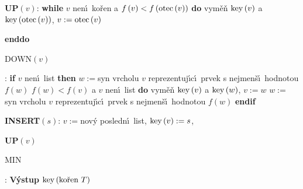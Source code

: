 {\bf UP$\left(v\right)$}:\newline 
{\bf while} $v$ nen\'\i\ ko\v ren a $f\left(v\right)<f\left(\operatorname{otec}\left(v\right)\right)$ {\bf do}\newline 
\phantom{---}vym\v e\v n $\operatorname{key}\left(v\right)$ a $\operatorname{key}\left(\operatorname{otec}\left(v\right)\right)$, $v:=\operatorname{otec}\left(v\right)$\newline 
{\bf enddo
\medskip

DOWN$\left(v\right)$}:\newline 
{\bf if} $v$ nen\'\i\ list {\bf then\newline}
\phantom{---}$w:=$syn vrcholu $v$ reprezentuj\'\i c\'\i\ prvek s nejmen\v s\'\i\ 
hodnotou $f\left(w\right)$\newline 
\phantom{---}{\bf while} $f\left(w\right)<f\left(v\right)$ a $v$ nen\'\i\ list {\bf do\newline }
\phantom{------}vym\v e\v n $\operatorname{key}\left(v\right)$ a $\operatorname{key}\left(w\right)$, $v:=w$\newline 
\phantom{------}$w:=$syn vrcholu $v$ reprezentuj\'\i c\'\i\ prvek s nejmen\v s\'\i\ 
hodnotou $f\left(w\right)$\newline 
\phantom{---}{\bf enddo}\newline 
{\bf endif}
\medskip

{\bf INSERT$\left(s\right)$}:\newline 
$v:=$nov\'y posledn\'\i\ list, $\operatorname{key}\left(v\right):=s$, {\bf UP$\left(v\right)$
\medskip

MIN}:\newline 
{\bf V\'ystup} $\key\left(\text{\rm ko\v ren }T\right)$
\medskip

